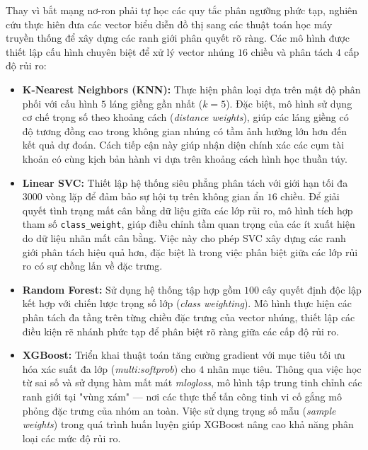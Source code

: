 Thay vì bắt mạng nơ-ron phải tự học các quy tắc phân ngưỡng phức tạp, nghiên cứu thực hiên đưa các vector biểu diễn đồ thị sang các thuật toán học máy truyền thống để xây dựng các ranh giới phân quyết rõ ràng. Các mô hình được thiết lập cấu hình chuyên biệt để xử lý vector nhúng $16$ chiều và phân tách $4$ cấp độ rủi ro:

\begin{itemize}[label={--}, itemsep=3pt]
    \item \textbf{K-Nearest Neighbors (KNN):} Thực hiện phân loại dựa trên mật độ phân phối với cấu hình $5$ láng giềng gần nhất ($k=5$). Đặc biệt, mô hình sử dụng cơ chế trọng số theo khoảng cách (\textit{distance weights}), giúp các láng giềng có độ tương đồng cao trong không gian nhúng có tầm ảnh hưởng lớn hơn đến kết quả dự đoán. Cách tiếp cận này giúp nhận diện chính xác các cụm tài khoản có cùng kịch bản hành vi dựa trên khoảng cách hình học thuần túy.
    
    \item \textbf{Linear SVC:} Thiết lập hệ thống siêu phẳng phân tách với giới hạn tối đa $3000$ vòng lặp để đảm bảo sự hội tụ trên không gian ẩn $16$ chiều. Để giải quyết tình trạng mất cân bằng dữ liệu giữa các lớp rủi ro, mô hình tích hợp tham số \texttt{class\_weight}, giúp điều chỉnh tầm quan trọng của các ít xuất hiện do dữ liệu nhãn mất cân bằng. Việc này cho phép SVC xây dựng các ranh giới phân tách hiệu quả hơn, đặc biệt là trong việc phân biệt giữa các lớp rủi ro có sự chồng lấn về đặc trưng.
    
    \item \textbf{Random Forest:} Sử dụng hệ thống tập hợp gồm $100$ cây quyết định độc lập kết hợp với chiến lược trọng số lớp (\textit{class weighting}). Mô hình thực hiện các phân tách đa tầng trên từng chiều đặc trưng của vector nhúng, thiết lập các điều kiện rẽ nhánh phức tạp để phân biệt rõ ràng giữa các cấp độ rủi ro.
    
    \item \textbf{XGBoost:} Triển khai thuật toán tăng cường gradient với mục tiêu tối ưu hóa xác suất đa lớp (\textit{multi:softprob}) cho $4$ nhãn mục tiêu. Thông qua việc học từ sai số và sử dụng hàm mất mát \textit{mlogloss}, mô hình tập trung tinh chỉnh các ranh giới tại "vùng xám" — nơi các thực thể tấn công tinh vi cố gắng mô phỏng đặc trưng của nhóm an toàn. Việc sử dụng trọng số mẫu (\textit{sample weights}) trong quá trình huấn luyện giúp XGBoost nâng cao khả năng phân loại các mức độ rủi ro.
\end{itemize}